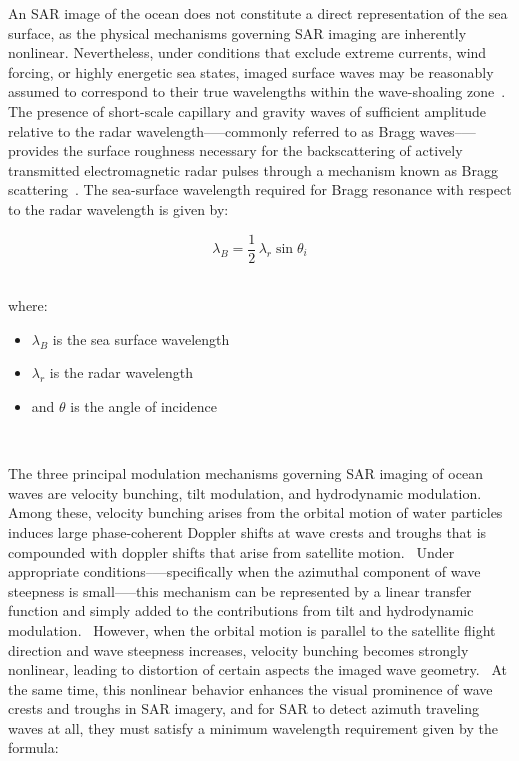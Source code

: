 \documentclass[12pt]{article}
\begin{document}
An SAR image of the ocean does not constitute a direct representation of the sea surface, as the physical mechanisms governing SAR imaging are inherently nonlinear. Nevertheless, under conditions that exclude extreme currents, wind forcing, or highly energetic sea states, imaged surface waves may be reasonably assumed to correspond to their true wavelengths within the wave-shoaling zone~\cite{Bergsma2019}. The presence of short-scale capillary and gravity waves of sufficient amplitude relative to the radar wavelength--—commonly referred to as Bragg waves--—provides the surface roughness necessary for the backscattering of actively transmitted electromagnetic radar pulses through a mechanism known as Bragg scattering~\cite{Bergsma2019, Rice1951, Brusch2011}. The sea-surface wavelength required for Bragg resonance with respect to the radar wavelength is given by:

\begin{equation}
\label{bragg}
\lambda_B = \frac{1}{2}\,\lambda_r \sin\theta_i
\end{equation}
~\cite{Bergsma2019}

where:
{\small
\begin{itemize}
    \item $\lambda_B$ is the sea surface wavelength
    \item $\lambda_r$ is the radar wavelength
    \item and $\theta$ is the angle of incidence
\end{itemize}
}
~\cite{Bergsma2019}

The three principal modulation mechanisms governing SAR imaging of ocean waves are velocity bunching, tilt modulation, and hydrodynamic modulation.~\cite{Bergsma2019, Hasselmann2013} Among these, velocity bunching arises from the orbital motion of water particles induces large phase-coherent Doppler shifts at wave crests and troughs that is compounded with doppler shifts that arise from satellite motion.~\cite{Bergsma2019, Hasselmann2013} Under appropriate conditions--—specifically when the azimuthal component of wave steepness is small—--this mechanism can be represented by a linear transfer function and simply added to the contributions from tilt and hydrodynamic modulation.~\cite{Hasselmann2013} However, when the orbital motion is parallel to the satellite flight direction and wave steepness increases, velocity bunching becomes strongly nonlinear, leading to distortion of certain aspects the imaged wave geometry.~\cite{Hasselmann2013} At the same time, this nonlinear behavior enhances the visual prominence of wave crests and troughs in SAR imagery, and for SAR to detect azimuth traveling waves at all, they must satisfy a minimum wavelength requirement given by the formula:
\end{document}
